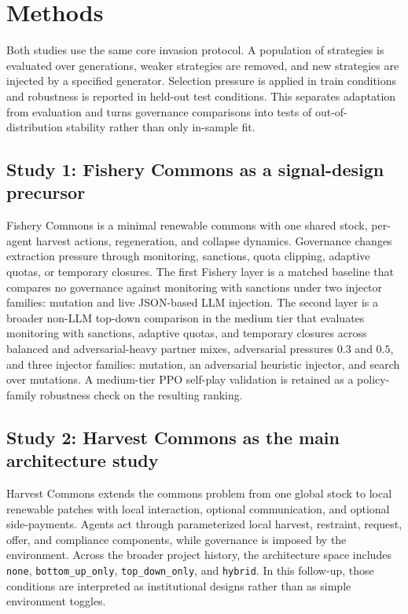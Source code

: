 \section{Methods}

Both studies use the same core invasion protocol. A population of strategies is evaluated over generations, weaker strategies are removed, and new strategies are injected by a specified generator. Selection pressure is applied in train conditions and robustness is reported in held-out test conditions. This separates adaptation from evaluation and turns governance comparisons into tests of out-of-distribution stability rather than only in-sample fit.

\subsection{Study 1: Fishery Commons as a signal-design precursor}

Fishery Commons is a minimal renewable commons with one shared stock, per-agent harvest actions, regeneration, and collapse dynamics. Governance changes extraction pressure through monitoring, sanctions, quota clipping, adaptive quotas, or temporary closures. The first Fishery layer is a matched baseline that compares no governance against monitoring with sanctions under two injector families: mutation and live JSON-based LLM injection. The second layer is a broader non-LLM top-down comparison in the medium tier that evaluates monitoring with sanctions, adaptive quotas, and temporary closures across balanced and adversarial-heavy partner mixes, adversarial pressures \(0.3\) and \(0.5\), and three injector families: mutation, an adversarial heuristic injector, and search over mutations. A medium-tier PPO self-play validation is retained as a policy-family robustness check on the resulting ranking.

\subsection{Study 2: Harvest Commons as the main architecture study}

Harvest Commons extends the commons problem from one global stock to local renewable patches with local interaction, optional communication, and optional side-payments. Agents act through parameterized local harvest, restraint, request, offer, and compliance components, while governance is imposed by the environment. Across the broader project history, the architecture space includes \texttt{none}, \texttt{bottom\_up\_only}, \texttt{top\_down\_only}, and \texttt{hybrid}. In this follow-up, those conditions are interpreted as institutional designs rather than as simple environment toggles.

